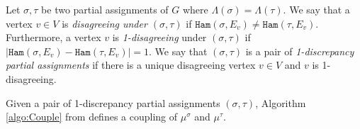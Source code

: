 \documentclass[11pt]{article}
\newcommand{\abs}[1]{\left\vert#1\right\vert}
\def\!#1{\mathtt{#1}}
\newcommand{\hktodo}[1]{{\color{blue}{#1}}}
\begin{document}
    Let $\sigma, \tau$ be two partial assignments of $G$ where $\Lambda(\sigma) = \Lambda(\tau)$.
    We say that a vertex $v \in V$ is \emph{disagreeing under $(\sigma, \tau)$} if ${\!{Ham}\left(\sigma,{E_v}\right)}\neq{\!{Ham}\left(\tau,{E_v}\right)}$. Furthermore, a vertex $v$ is \emph{1-disagreeing} under $(\sigma, \tau)$ if $\abs{{\!{Ham}\left(\sigma,{E_v}\right)}-{\!{Ham}\left(\tau,{E_v}\right)}}=1$.
    We say that $(\sigma, \tau)$ is a pair of \emph{1-discrepancy partial assignments} if there is a unique disagreeing vertex $v \in V$ and $v$ is 1-disagreeing.

    Given a pair of 1-discrepancy partial assignments $(\sigma,\tau)$,
    Algorithm \ref{algo:Couple} from \cite{CG24bMatching} defines a 
    coupling of $\mu^{\sigma}$ and $\mu^{\tau}$.
    \hktodo{the use of the coupling in our paper}
\end{document}
